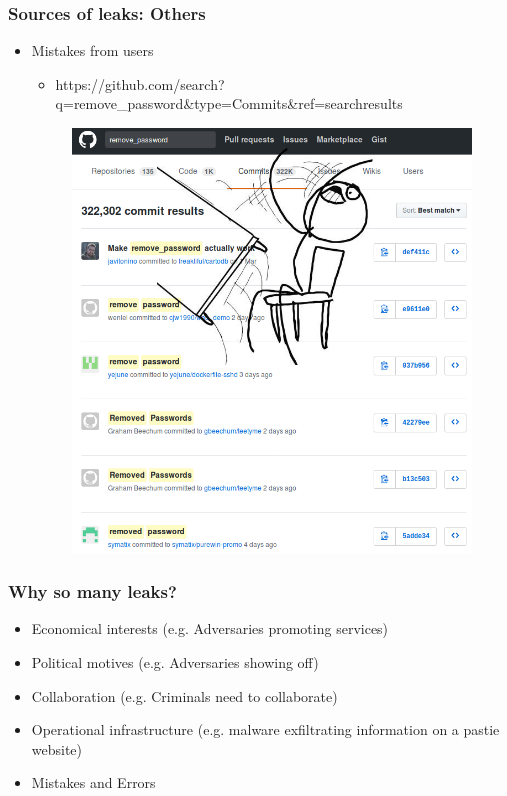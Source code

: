 \begin{frame}
    \frametitle{Sources of leaks: Others}
        \begin{itemize}
            \item Mistakes from users
            \begin{itemize}
                \item \tiny{https://github.com/}\normalsize{search?q=remove\_password}\tiny{\&type=Commits\&ref=searchresults}
            \end{itemize}
            \begin{figure}
                \includegraphics[scale=0.4]{images/git-pass-table.png}
            \end{figure}
        \end{itemize}
\end{frame}

\begin{frame}
        \frametitle{Why so many leaks?}
        \begin{itemize}
                \item Economical interests (e.g. Adversaries promoting services)
                \item Political motives (e.g. Adversaries showing off)
                \item Collaboration (e.g. Criminals need to collaborate)
                \item Operational infrastructure (e.g. malware exfiltrating information on a pastie website)
                \item Mistakes and Errors
        \end{itemize}
\end{frame}


